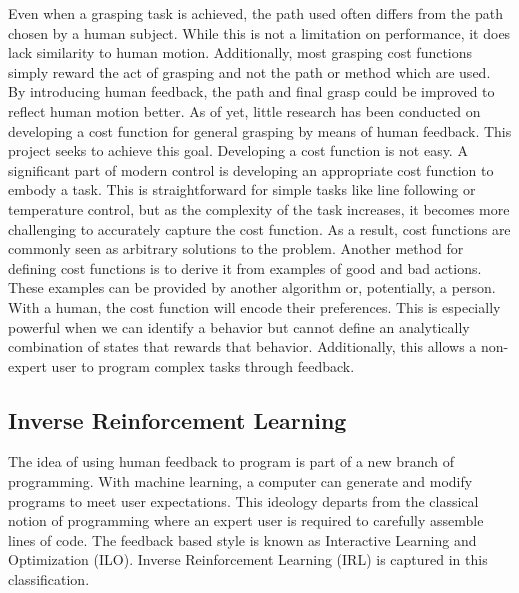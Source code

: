 \documentclass{article}
\begin{document}
    Even when a grasping task is achieved, the path used often differs from the path chosen by a human subject.  While this is not a limitation on performance, it does lack similarity to human motion.  Additionally, most grasping cost functions simply reward the act of grasping and not the path or method which are used.  By introducing human feedback, the path and final grasp could be improved to reflect human motion better. As of yet, little research has been conducted on developing a cost function for general grasping by means of human feedback. This project seeks to achieve this goal.  Developing a cost function is not easy.  A significant part of modern control is developing an appropriate cost function to embody a task.  This is straightforward for simple tasks like line following or temperature control, but as the complexity of the task increases, it becomes more challenging to accurately capture the cost function.  As a result, cost functions are commonly seen as arbitrary solutions to the problem.  Another method for defining cost functions is to derive it from examples of good and bad actions.  These examples can be provided by another algorithm or, potentially, a person.  With a human, the cost function will encode their preferences.  This is especially powerful when we can identify a behavior but cannot define an analytically combination of states that rewards that behavior.  Additionally, this allows a non-expert user to program complex tasks through feedback.

\subsection{Inverse Reinforcement Learning}

    The idea of using human feedback to program is part of a new branch of programming.  With machine learning, a computer can generate and modify programs to meet user expectations.  This ideology departs from the classical notion of programming where an expert user is required to carefully assemble lines of code.  The feedback based style is known as Interactive Learning and Optimization (ILO)\cite{Akrour2014}.  Inverse Reinforcement Learning (IRL) is captured in this classification.
    
\end{document}
